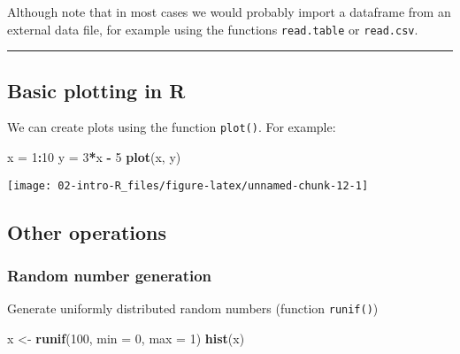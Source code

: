 \documentclass[
]{book}
\newenvironment{Shaded}{\begin{snugshade}}{\end{snugshade}}
\newcommand{\AttributeTok}[1]{\textcolor[rgb]{0.13,0.29,0.53}{#1}}
\newcommand{\DecValTok}[1]{\textcolor[rgb]{0.00,0.00,0.81}{#1}}
\newcommand{\FunctionTok}[1]{\textcolor[rgb]{0.13,0.29,0.53}{\textbf{#1}}}
\newcommand{\NormalTok}[1]{#1}
\newcommand{\OtherTok}[1]{\textcolor[rgb]{0.56,0.35,0.01}{#1}}
\newcommand{\SpecialCharTok}[1]{\textcolor[rgb]{0.81,0.36,0.00}{\textbf{#1}}}
\begin{document}
Although note that in most cases we would probably import a dataframe from an external data file, for example using the functions \texttt{read.table} or \texttt{read.csv}.

\begin{center}\rule{0.5\linewidth}{0.5pt}\end{center}

\subsection{Basic plotting in R}\label{basic-plotting-in-r}

We can create plots using the function \texttt{plot()}. For example:

\begin{Shaded}
\begin{Highlighting}[]
\NormalTok{x }\OtherTok{=} \DecValTok{1}\SpecialCharTok{:}\DecValTok{10}
\NormalTok{y }\OtherTok{=} \DecValTok{3}\SpecialCharTok{*}\NormalTok{x }\SpecialCharTok{{-}} \DecValTok{5}
\FunctionTok{plot}\NormalTok{(x, y)}
\end{Highlighting}
\end{Shaded}

\begin{center}\texttt{[image: 02-intro-R\_files/figure-latex/unnamed-chunk-12-1]} \end{center}

\subsection{Other operations}\label{other-operations}

\subsubsection{Random number generation}\label{random-number-generation}

Generate uniformly distributed random numbers (function \texttt{runif()})

\begin{Shaded}
\begin{Highlighting}[]
\NormalTok{x }\OtherTok{\textless{}{-}} \FunctionTok{runif}\NormalTok{(}\DecValTok{100}\NormalTok{, }\AttributeTok{min =} \DecValTok{0}\NormalTok{, }\AttributeTok{max =} \DecValTok{1}\NormalTok{)}
\FunctionTok{hist}\NormalTok{(x)}
\end{Highlighting}
\end{Shaded}
\end{document}
